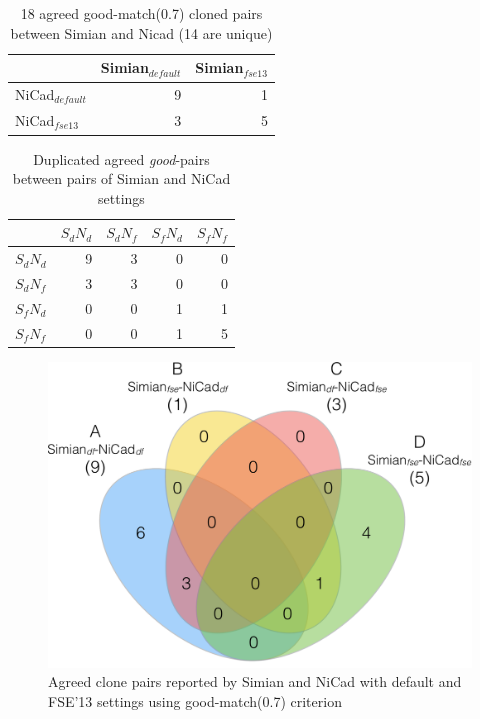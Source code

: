 \documentclass{IEEEtran}
\begin{document}
\begin{table}[h]
	\centering
	\caption{18 agreed good-match(0.7) cloned pairs between Simian and Nicad (14 are unique)}
	\label{t_agreed_good_clone_pairs}
	\begin{tabular}{l|r|r}
		\hline
		& Simian$_{\mathrm{\textit{default}}}$ & Simian$_{\mathrm{\textit{fse13}}}$ \\ %
		\hline
		NiCad$_{\mathrm{\textit{default}}}$ & 9 & 1 \\ %
		NiCad$_{\mathrm{\textit{fse13}}}$   & 3 & 5 \\ %
		\hline
	\end{tabular}
\end{table}

\begin{table}[H]
	\centering
	\caption{Duplicated agreed \textit{good}-pairs between pairs of Simian and NiCad settings}
	\label{t_dup_agreed_good_clone_pairs}
	\begin{tabular}{l|r|r|r|r}
		\hline
		& $S_dN_d$ & $S_dN_f$ & $S_fN_d$ & $S_fN_f$ \\ %
		\hline
		$S_dN_d$ & 9 & 3 & 0 & 0 \\%
		$S_dN_f$ & 3 & 3 & 0 & 0 \\ %
		$S_fN_d$ & 0 & 0 & 1 & 1 \\
		$S_fN_f$ & 0 & 0 & 1 & 5 \\	
		\hline
	\end{tabular}
\end{table}

\begin{figure}[H]
	\centering
	\includegraphics[width=0.5\linewidth]{venn4_pairs_good}
	\caption[Agreed clone pairs reported by Simian and NiCad with default and FSE'13 settings using good-match(0.7) criterion]{Agreed clone pairs reported by Simian and NiCad with default and FSE'13 settings using good-match(0.7) criterion}
	\label{fig:venn4_pairs}
\end{figure}
\end{document}
